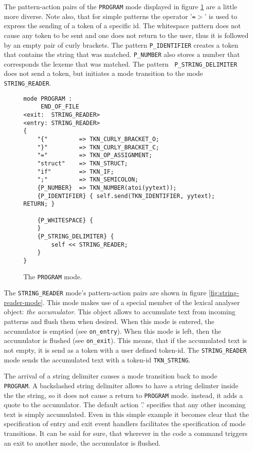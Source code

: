 The pattern-action pairs of the {\tt PROGRAM} mode displayed in figure
\ref{fig:program-mode} are a little more diverse. Note also, that for simple
patterns the operator '{\tt =}$>$' is used to express the sending of a token
of a specific id. The whitespace pattern does not cause any token to be sent
and one does not return to the user, thus it is followed by an empty pair of
curly brackets. The pattern {\tt P\_IDENTIFIER} creates a token that contains
the string that was matched.  {\tt P\_NUMBER} also stores a number that
corresponds the lexeme that was matched.  The pattern {\tt
  P\_STRING\_DELIMITER} does not send a token, but initiates a mode transition
to the mode {\tt STRING\_READER}.


\begin{figure}
\begin{lstlisting}
mode PROGRAM :
     END_OF_FILE
<exit:  STRING_READER>
<entry: STRING_READER>
{
    "{"         => TKN_CURLY_BRACKET_O;
    "}"         => TKN_CURLY_BRACKET_C;
    "="         => TKN_OP_ASSIGNMENT;
    "struct"    => TKN_STRUCT;
    "if"        => TKN_IF;
    ";"         => TKN_SEMICOLON;
    {P_NUMBER}  => TKN_NUMBER(atoi(yytext));
    {P_IDENTIFIER} { self.send(TKN_IDENTIFIER, yytext); RETURN; }

    {P_WHITESPACE} {
    }
    {P_STRING_DELIMITER} {
        self << STRING_READER;
    }
}
\end{lstlisting}
\caption{The {\tt PROGRAM} mode.}
\label{fig:program-mode}
\end{figure}


The {\tt STRING\_READER} mode's pattern-action pairs are shown in figure
\ref{fig:string-reader-mode}. This mode makes use of a special member of the
lexical analyser object: {\it the accumulator}. This object allows to
accumulate text from incoming patterns and flush them when desired. When this
mode is entered, the accumulator is emptied (see {\tt on\_entry}). When this
mode is left, then the accumulator is flushed (see {\tt on\_exit}). This
means, that if the accumulated text is not empty, it is send as a token with a
user defined token-id. The {\tt STRING\_READER} mode sends the accumulated
text with a token-id {\tt TKN\_STRING}.

The arrival of a string delimiter causes a mode transition back to mode {\tt
  PROGRAM}. A backslashed string delimiter allows to have a string delimter
inside the the string, so it does not cause a return to {\tt PROGRAM} mode.
instead, it adds a quote to the accumulator. The default action '.' specifies
that any other incoming text is simply accumulated. Even in this simple
example it becomes clear that the specification of entry and exit event
handlers facilitates the specification of mode transitions. It can be said
for sure, that wherever in the code a command triggers an exit to another
mode, the accumulator is flushed.

